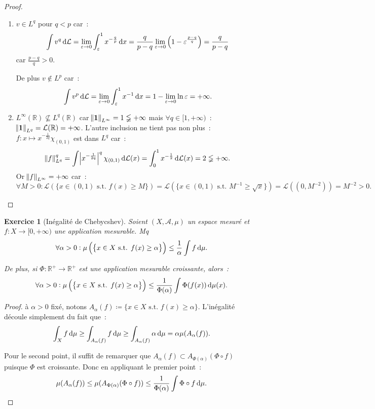 \documentclass{article}
\newtheorem{ex}{Exercice}[section]
\newcommand{\pinfty}{{+\infty}}
\newcommand{\st}{\text{ s.t. }}
\newcommand{\R}{{\mathbb R}}
\begin{document}
\begin{proof}
\begin{enumerate}
	\item $v \in L^q$ pour $q < p$ car~:
	\[\int v^q\dif\mathcal L = \lim_{\varepsilon \to 0}\int_\varepsilon^1x^{-\frac qp}\dif x = \frac q{p-q}\lim_{\varepsilon \to 0}\left(1 - \varepsilon^{\frac {p-q}q}\right)
	= \frac q{p-q}\]
	car $\frac {p-q}q > 0$.

	De plus $v \not \in L^p$ car~:
	\[\int v^p\dif\mathcal L = \lim_{\varepsilon \to 0}\int_\varepsilon^1x^{-1}\dif x = 1 - \lim_{\varepsilon \to 0}\ln\varepsilon = \pinfty.\]

	\item $L^\infty(\R) \not \subseteq L^q(\R)$ car $\norm {\mathbf 1}_{L^\infty} = 1 \lneqq \pinfty$ mais $\forall q \in [1, \pinfty)$~:
	$\norm {\mathbf 1}_{L^q} = \mathcal L(\R) = \pinfty$. L'autre inclusion ne tient pas non plus~: $f : x \mapsto x^{-\frac 1{2q}}\chi_{(0, 1)}$ est dans $L^q$ car~:
	\[\norm {f}_{L^q}^q = \int \abs {x^{-\frac 1{2q}}}^q\chi_{(0, 1)}\dif \mathcal L(x) = \int_0^1x^{-\frac 12}\dif\mathcal L(x) = 2 \lneqq \pinfty.\]
	Or $\norm f_{L^\infty} = \pinfty$ car~:
	\[\forall M > 0 : \mathcal L(\{x \in (0, 1) \st f(x) \geq M\}) = \mathcal L(\{x \in (0, 1) \st M^{-1} \geq \sqrt x\}) = \mathcal L((0, M^{-2})) = M^{-2} > 0.\]
\end{enumerate}
\end{proof}

\begin{ex}[Inégalité de Chebycshev] Soient $(X, \mathcal A, \mu)$ un espace mesuré et $f : X \to [0, \pinfty)$ une application mesurable. Mq
\[\forall \alpha > 0 : \mu\left(\left\{x \in X \st f(x) \geq \alpha\right\}\right) \leq \frac 1\alpha\int f\dif\mu.\]

De plus, si $\Phi : \R^+ \to \R^+$ est une application mesurable croissante, alors~:
\[\forall \alpha > 0 : \mu\left(\left\{x \in X \st f(x) \geq \alpha\right\}\right) \leq \frac 1{\Phi(\alpha)}\int \Phi(f(x))\dif\mu(x).\]
\end{ex}

\begin{proof} à $\alpha > 0$ fixé, notons $A_\alpha(f) \coloneqq \{x \in X \st f(x) \geq \alpha\}$. L'inégalité découle simplement du fait que~:
\[\int_Xf\dif\mu \geq \int_{A_\alpha(f)}f\dif\mu \geq \int_{A_\alpha(f)}\alpha\dif\mu = \alpha\mu(A_\alpha(f)).\]

Pour le second point, il suffit de remarquer que $A_\alpha(f) \subset A_{\Phi(\alpha)}(\Phi \circ f)$ puisque $\Phi$ est croissante. Donc en appliquant le premier point~:
\[\mu(A_\alpha(f)) \leq \mu(A_{\Phi(\alpha)}(\Phi \circ f)) \leq \frac 1{\Phi(\alpha)}\int\Phi\circ f\dif\mu.\]
\end{proof}
\end{document}
